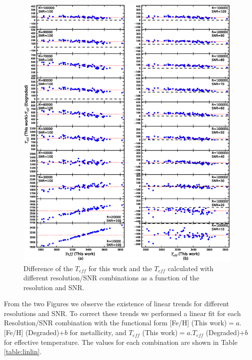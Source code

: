 \documentclass{aa}
\begin{document}
\begin{figure}[h!]
\begin{center}
\includegraphics[scale=0.9]{pics/resnr_teffv2.eps}
\end{center}
\caption{Difference of the $T_{eff}$ for this work and the $T_{eff}$ calculated with different resolution/SNR combinations as a function of the resolution and SNR.}
\label{fig:resnr-teff}
\end{figure}


From the two Figures we observe the existence of linear trends for different resolutions and SNR. To correct these trends we performed a linear fit for each Resolution/SNR combination with the functional form [Fe/H] (This work)$ = a.$[Fe/H] (Degraded)+$b$ for metallicity, and 
$T_{eff}$ (This work)$ = a.T_{eff}$ (Degraded)+$b$ for effective temperature. The values for each combination are shown in Table \ref{table:linlin}.
\end{document}
